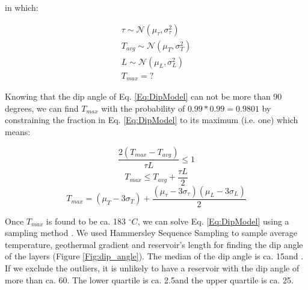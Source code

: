\documentclass[review,authoryear, 12pt]{elsarticle}\usepackage[]{graphicx}\usepackage[]{color}
\begin{document}
in which:

\begin{eqnarray}
\tau \sim \mathcal{N}(\mu_\tau,\sigma^2_\tau) \\
T_{avg} \sim \mathcal{N}(\mu_T,\sigma^2_T) \\
L \sim \mathcal{N}(\mu_L,\sigma^2_L) \\
T_{max}=?
\end{eqnarray}

Knowing that the dip angle of Eq. \ref{Eq:DipModel} can not be more than 90 degrees, we can find $T_{max}$ with the probability of $0.99*0.99=0.9801$ by constraining the fraction in Eq. \ref{Eq:DipModel} to its maximum (i.e. one) which means:

\begin{equation}
\frac{2(T_{max}-T_{avg})}{\tau L} \leq 1 
\end{equation}
\begin{equation}
T_{max} \leq T_{avg}+\frac{\tau L}{2} 
\end{equation}
\begin{equation}
T_{max} = ({\mu_T-3\sigma_T})+\frac{(\mu_{\tau}-3\sigma_{\tau})(\mu_{L}-3\sigma_L)}{2}
\label{Eq:TmaxSolution}
\end{equation}



Once $T_{max}$  is found to be ca. 183 $^\circ C$, we can solve Eq. \ref{Eq:DipModel} using a sampling method \citep{kroese2011handbook}. We used Hammersley Sequence Sampling to sample average temperature, geothermal gradient and reservoir's length for finding the dip angle of the layers (Figure \ref{Fig:dip_angle}). The median of the dip angle is ca. 15\degree and . If we exclude the outliers, it is unlikely to have a reservoir with the dip angle of more than ca. 60\degree. The lower quartile is ca. 2.5\degree and the upper quartile is ca. 25\degree.
\end{document}
